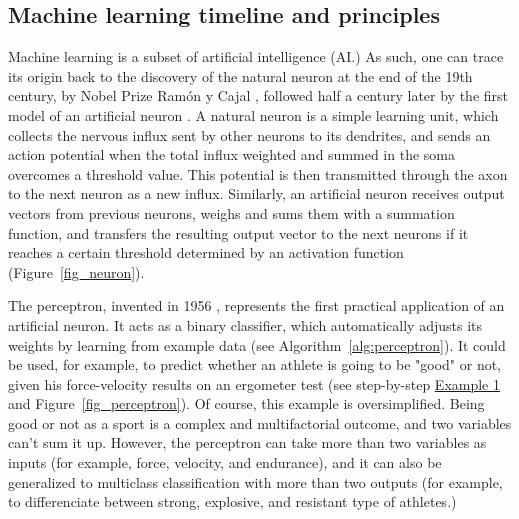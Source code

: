 \subsection{Machine learning timeline and principles}

Machine learning is a subset of artificial intelligence (AI.) As such, one can trace its origin back to the discovery of the natural neuron at the end of the 19th century, by Nobel Prize Ramón y Cajal \cite{Lopez2006}, followed half a century later by the first model of an artificial neuron \cite{Mcculloch1943}. A natural neuron is a simple learning unit, which collects the nervous influx sent by other neurons to its dendrites, and sends an action potential when the total influx weighted and summed in the soma overcomes a threshold value. This potential is then transmitted through the axon to the next neuron as a new influx. Similarly, an artificial neuron receives output vectors from previous neurons, weighs and sums them with a summation function, and transfers the resulting output vector to the next neurons if it reaches a certain threshold determined by an activation function (Figure~\ref{fig_neuron}). 

The perceptron, invented in 1956 \cite{Rosenblatt1958}, represents the first practical application of an artificial neuron. It acts as a binary classifier, which automatically adjusts its weights by learning from example data (see Algorithm~\ref{alg:perceptron}). It could be used, for example, to predict whether an athlete is going to be "good" or not, given his force-velocity results on an ergometer test (see step-by-step \hyperlink{example1}{Example 1} and Figure~\ref{fig_perceptron}). Of course, this example is oversimplified. Being good or not as a sport is a complex and multifactorial outcome, and two variables can't sum it up. However, the perceptron can take more than two variables as inputs (for example, force, velocity, and endurance), and it can also be generalized to multiclass classification with more than two outputs (for example, to differenciate between strong, explosive, and resistant type of athletes.) 

\clearpage 

